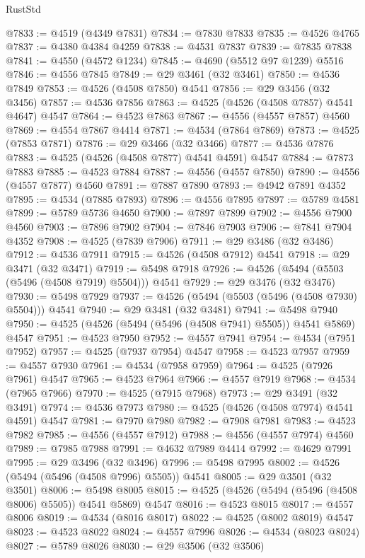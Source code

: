 \begin{lexlean}{RustStd}
\begin{coremodule}
@7833 := @4519 (@4349 @7831)
@7834 := @7830 @7833
@7835 := @4526 @4765
@7837 := @4380 @4384 @4259
@7838 := @4531 @7837
@7839 := @7835 @7838
@7841 := @4550 (@4572 @1234)
@7845 := @4690 (@5512 @97 @1239) @5516
@7846 := @4556 @7845
@7849 := @29 @3461 (@32 @3461)
@7850 := @4536 @7849
@7853 := @4526 (@4508 @7850) @4541
@7856 := @29 @3456 (@32 @3456)
@7857 := @4536 @7856
@7863 := @4525 (@4526 (@4508 @7857) @4541 @4647) @4547
@7864 := @4523 @7863
@7867 := @4556 (@4557 @7857) @4560
@7869 := @4554 @7867 @4414
@7871 := @4534 (@7864 @7869)
@7873 := @4525 (@7853 @7871)
@7876 := @29 @3466 (@32 @3466)
@7877 := @4536 @7876
@7883 := @4525 (@4526 (@4508 @7877) @4541 @4591) @4547
@7884 := @7873 @7883
@7885 := @4523 @7884
@7887 := @4556 (@4557 @7850)
@7890 := @4556 (@4557 @7877) @4560
@7891 := @7887 @7890
@7893 := @4942 @7891 @4352
@7895 := @4534 (@7885 @7893)
@7896 := @4556 @7895
@7897 := @5789 @4581
@7899 := @5789 @5736 @4650
@7900 := @7897 @7899
@7902 := @4556 @7900 @4560
@7903 := @7896 @7902
@7904 := @7846 @7903
@7906 := @7841 @7904 @4352
@7908 := @4525 (@7839 @7906)
@7911 := @29 @3486 (@32 @3486)
@7912 := @4536 @7911
@7915 := @4526 (@4508 @7912) @4541
@7918 := @29 @3471 (@32 @3471)
@7919 := @5498 @7918
@7926 := @4526 (@5494 (@5503 (@5496 (@4508 @7919) @5504))) @4541
@7929 := @29 @3476 (@32 @3476)
@7930 := @5498 @7929
@7937 := @4526 (@5494 (@5503 (@5496 (@4508 @7930) @5504))) @4541
@7940 := @29 @3481 (@32 @3481)
@7941 := @5498 @7940
@7950 := @4525 (@4526 (@5494 (@5496 (@4508 @7941) @5505)) @4541 @5869) @4547
@7951 := @4523 @7950
@7952 := @4557 @7941
@7954 := @4534 (@7951 @7952)
@7957 := @4525 (@7937 @7954) @4547
@7958 := @4523 @7957
@7959 := @4557 @7930
@7961 := @4534 (@7958 @7959)
@7964 := @4525 (@7926 @7961) @4547
@7965 := @4523 @7964
@7966 := @4557 @7919
@7968 := @4534 (@7965 @7966)
@7970 := @4525 (@7915 @7968)
@7973 := @29 @3491 (@32 @3491)
@7974 := @4536 @7973
@7980 := @4525 (@4526 (@4508 @7974) @4541 @4591) @4547
@7981 := @7970 @7980
@7982 := @7908 @7981
@7983 := @4523 @7982
@7985 := @4556 (@4557 @7912)
@7988 := @4556 (@4557 @7974) @4560
@7989 := @7985 @7988
@7991 := @4632 @7989 @4414
@7992 := @4629 @7991
@7995 := @29 @3496 (@32 @3496)
@7996 := @5498 @7995
@8002 := @4526 (@5494 (@5496 (@4508 @7996) @5505)) @4541
@8005 := @29 @3501 (@32 @3501)
@8006 := @5498 @8005
@8015 := @4525 (@4526 (@5494 (@5496 (@4508 @8006) @5505)) @4541 @5869) @4547
@8016 := @4523 @8015
@8017 := @4557 @8006
@8019 := @4534 (@8016 @8017)
@8022 := @4525 (@8002 @8019) @4547
@8023 := @4523 @8022
@8024 := @4557 @7996
@8026 := @4534 (@8023 @8024)
@8027 := @5789 @8026
@8030 := @29 @3506 (@32 @3506)

\end{coremodule}
\end{lexlean}
